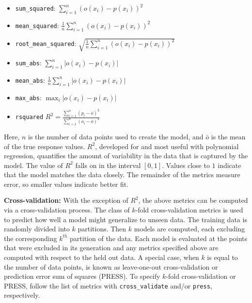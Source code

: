 \begin{itemize}
\item {\tt sum\_squared}: $\sum_{i=1}^{n}{ \left( o(x_i) - p(x_i) \right) ^2}$

\item {\tt mean\_squared}: $\frac{1}{n}\sum_{i=1}^{n}{ \left( o(x_i) - p(x_i) \right) ^2}$

\item {\tt root\_mean\_squared}: $\sqrt{\frac{1}{n}\sum_{i=1}^{n}{ \left( o(x_i) - p(x_i) \right) ^2}}$

\item {\tt sum\_abs}: $\sum_{i=1}^{n}{ \left| o(x_i) - p(x_i) \right| }$

\item {\tt mean\_abs}: $\frac{1}{n}\sum_{i=1}^{n}{ \left| o(x_i) - p(x_i) \right| }$

\item {\tt max\_abs}: $\max_i \left| o(x_i) - p(x_i) \right|$

\item {\tt rsquared} $ R^2 = \frac{\sum_{i=1}^{n}{\left(p_i -
        \bar{o}\right)^2}}{ \sum_{i=1}^{n}{\left(o_i -
        \bar{o}\right)^2}}$
\end{itemize}

Here, $n$ is the number of data points used to create the model, and
$\bar{o}$ is the mean of the true response values.  $R^2$, developed
for and most useful with polynomial regression, quantifies the amount
of variability in the data that is captured by the model.  The value
of $R^2$ falls on in the interval $[0,1]$.  Values close to $1$
indicate that the model matches the data closely.  The remainder of
the metrics measure error, so smaller values indicate better fit.

{\bf Cross-validation:} With the exception of $R^2$, the above metrics
can be computed via a cross-validation process.  The class of $k$-fold
cross-validation metrics is used to predict how well a model might
generalize to unseen data.  The training data is randomly divided into
$k$ partitions.  Then $k$ models are computed, each excluding the
corresponding $k^{th}$ partition of the data.  Each model is evaluated
at the points that were excluded in its generation and any metrics
specified above are computed with respect to the held out data.  A
special case, when $k$ is equal to the number of data points, is known
as leave-one-out cross-validation or prediction error sum of squares
(PRESS).  To specify $k$-fold cross-validation or PRESS, follow the
list of metrics with {\tt cross\_validate} and/or {\tt press},
respectively.

